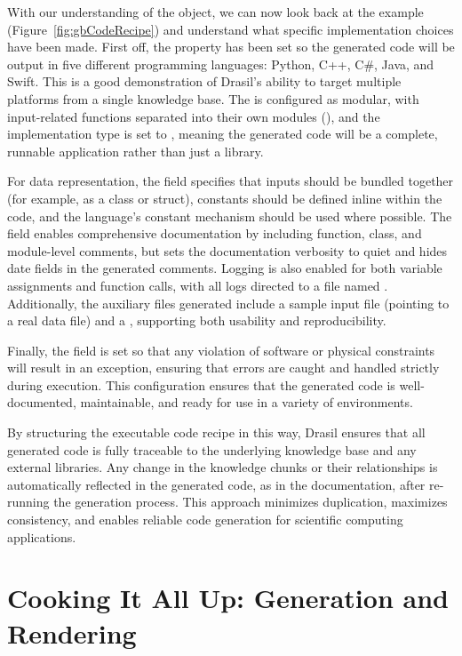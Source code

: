 With our understanding of the  object, we can now look back at 
the \gb{} example (Figure~\ref{fig:gbCodeRecipe}) and understand what 
specific implementation choices have been made. First off, the  
property has been set so the generated code will be output in five different 
programming languages: Python, C++, C\#, Java, and Swift. This is a good 
demonstration of Drasil's ability to target multiple platforms from a 
single knowledge base. The  is configured as modular, with 
input-related functions separated into their own modules
(), and the implementation type is set to
, meaning the generated code will be a complete, runnable 
application rather than just a library. 

For data representation, the  field specifies that inputs 
should be bundled together (for example, as a class or struct), constants 
should be defined inline within the code, and the language's constant mechanism 
should be used where possible. The  field enables comprehensive 
documentation by including function, class, and module-level comments, but sets 
the documentation verbosity to quiet and hides date fields in the generated 
comments. Logging is also enabled for both variable assignments and function 
calls, with all logs directed to a file named . Additionally, 
the auxiliary files generated include a sample input file (pointing to a real 
data file) and a , supporting both usability and reproducibility. 

Finally, the  field is set so that any violation of 
software or physical constraints will result in an exception, ensuring that 
errors are caught and handled strictly during execution. This configuration 
ensures that the generated \gb{} code is well-documented, maintainable, and 
ready for use in a variety of environments.

By structuring the executable code recipe in this way, Drasil ensures that all 
generated code is fully traceable to the underlying knowledge base and any 
external libraries. Any change in the knowledge chunks or their relationships 
is automatically reflected in the generated code, as in the documentation, 
after re-running the generation process. This approach minimizes duplication, 
maximizes consistency, and enables reliable code generation for scientific 
computing applications.

\section{Cooking It All Up: Generation and Rendering}
\label{sec:gen}

